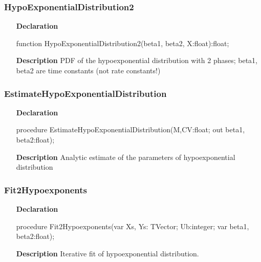 \documentclass[12pt,a4paper,oneside]{report}
\newcommand{\declarationitem}[1]{\textbf{#1}}
\newcommand{\descriptiontitle}[1]{\textbf{#1}}
\begin{document}
\subsubsection{HypoExponentialDistribution2}
\label{udistribs-HypoExponentialDistribution2}
\begin{itemize}\item[\declarationitem{Declaration}\hfill]
	\begin{flushleft}
		\begin{ttfamily}
			function HypoExponentialDistribution2(beta1, beta2, X:float):float;\end{ttfamily}
		
	\end{flushleft}
	
	\par
	\item[\descriptiontitle{Description}]
	PDF of the hypoexponential distribution with 2 phases; beta1, beta2 are time constants (not rate constants!)
	
\end{itemize}
\subsubsection{EstimateHypoExponentialDistribution}
\label{udistribs-EstimateHypoExponentialDistribution}
\begin{itemize}\item[\declarationitem{Declaration}\hfill]
	\begin{flushleft}
		\begin{ttfamily}
			procedure EstimateHypoExponentialDistribution(M,CV:float; out beta1, beta2:float);\end{ttfamily}
	\end{flushleft}
	
	\par
	\item[\descriptiontitle{Description}]
	Analytic estimate of the parameters of hypoexponential distribution
	
\end{itemize}
\subsubsection{Fit2Hypoexponents}
\label{udistribs-Fit2Hypoexponents}
\begin{itemize}\item[\declarationitem{Declaration}\hfill]
	\begin{flushleft}
		\begin{ttfamily}
			procedure Fit2Hypoexponents(var Xs, Ys: TVector; Ub:integer; var beta1, beta2:float);\end{ttfamily}
		
	\end{flushleft}
	
	\par
	\item[\descriptiontitle{Description}]
	Iterative fit of hypoexponential distribution.
	
\end{itemize}
\end{document}
